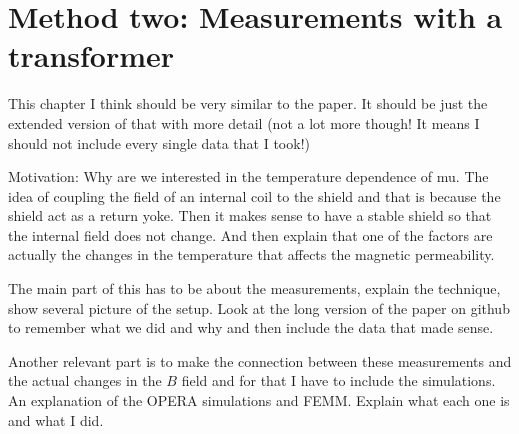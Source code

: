\section{Method two: Measurements with a transformer}




\begin{description}
\item{This chapter I think should be very similar to the paper. It
  should be just the extended version of that with more detail (not a
  lot more though! It means I should not include every single data
  that I took!)}
  \item{Motivation: Why are we interested in the temperature
    dependence of mu. The idea of coupling the field of an internal
    coil to the shield and that is because the shield act as a return
    yoke. Then it makes sense to have a stable shield so that the
    internal field does not change. And then explain that one of the
    factors are actually the changes in the temperature that affects
    the magnetic permeability.}
  \item{The main part of this has to be about the measurements,
    explain the technique, show several picture of the setup. Look at
    the long version of the paper on github to remember what we did
    and why and then include the data that made sense.}
  \item{Another relevant part is to make the connection between these
    measurements and the actual changes in the $B$ field and for that
    I have to include the simulations. An explanation of the OPERA
    simulations and FEMM. Explain what each one is and what I did.}
\end{description}


